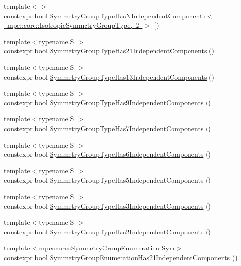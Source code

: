 \begin{DoxyCompactItemize}
\item 
{\footnotesize template$<$$>$ }\\constexpr bool \mbox{\hyperlink{namespacempc_1_1core_aaac96533f9150c7f0f9662d1239c4ec8}{Symmetry\+Group\+Type\+Has\+N\+Independent\+Components$<$ mpc\+::core\+::\+Isotropic\+Symmetry\+Group\+Type, 2 $>$}} ()
\item 
{\footnotesize template$<$typename S $>$ }\\constexpr bool \mbox{\hyperlink{namespacempc_1_1core_ae6d0b15349b8bc18ab64a31b19fdd553}{Symmetry\+Group\+Type\+Has21\+Independent\+Components}} ()
\item 
{\footnotesize template$<$typename S $>$ }\\constexpr bool \mbox{\hyperlink{namespacempc_1_1core_a384195f1b9c2914504451efcbd89f188}{Symmetry\+Group\+Type\+Has13\+Independent\+Components}} ()
\item 
{\footnotesize template$<$typename S $>$ }\\constexpr bool \mbox{\hyperlink{namespacempc_1_1core_aa01c4ada3a7c3a782f270df513b509f1}{Symmetry\+Group\+Type\+Has9\+Independent\+Components}} ()
\item 
{\footnotesize template$<$typename S $>$ }\\constexpr bool \mbox{\hyperlink{namespacempc_1_1core_accdfd67f26b27f03bbab68358d954bb0}{Symmetry\+Group\+Type\+Has7\+Independent\+Components}} ()
\item 
{\footnotesize template$<$typename S $>$ }\\constexpr bool \mbox{\hyperlink{namespacempc_1_1core_a148ec307192d560f052a1cc0c8dffb7c}{Symmetry\+Group\+Type\+Has6\+Independent\+Components}} ()
\item 
{\footnotesize template$<$typename S $>$ }\\constexpr bool \mbox{\hyperlink{namespacempc_1_1core_acb4d9bceab008077200a0a4c9ab91c69}{Symmetry\+Group\+Type\+Has5\+Independent\+Components}} ()
\item 
{\footnotesize template$<$typename S $>$ }\\constexpr bool \mbox{\hyperlink{namespacempc_1_1core_a7ad5874b01d418427d2f88e392213289}{Symmetry\+Group\+Type\+Has3\+Independent\+Components}} ()
\item 
{\footnotesize template$<$typename S $>$ }\\constexpr bool \mbox{\hyperlink{namespacempc_1_1core_a5ff452bd2a36ed7bfbaff4e81d07290f}{Symmetry\+Group\+Type\+Has2\+Independent\+Components}} ()
\item 
{\footnotesize template$<$mpc\+::core\+::\+Symmetry\+Group\+Enumeration Sym$>$ }\\constexpr bool \mbox{\hyperlink{namespacempc_1_1core_a21ac1a6b1e3d110dfe48271ea0a94ca1}{Symmetry\+Group\+Enumeration\+Has21\+Independent\+Components}} ()

\end{DoxyCompactItemize}
